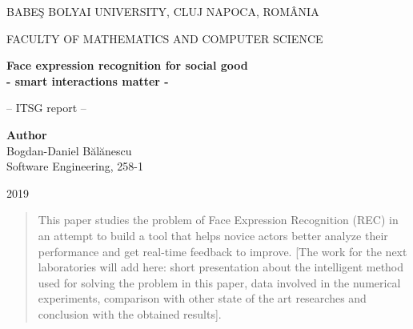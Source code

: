 \documentclass[runningheads,a4paper,11pt]{report}
\begin{document}
\begin{titlepage}
\sloppy
\begin{center}
BABE\c S BOLYAI UNIVERSITY, CLUJ NAPOCA, ROM\^ ANIA

FACULTY OF MATHEMATICS AND COMPUTER SCIENCE

\vspace{5cm}

\Huge \textbf
{
Face expression recognition for social good \\
- smart interactions matter -
}

\vspace{1cm}

\normalsize -- ITSG report --

\end{center}


\vspace{5cm}

\begin{flushright}
\Large{\textbf{Author}}\\
Bogdan-Daniel B\u{a}l\u{a}nescu\\
Software Engineering, 258-1
\end{flushright}

\vspace{4cm}

\begin{center}
2019
\end{center}

\end{titlepage}


\begin{abstract}
	This paper studies the problem of Face Expression Recognition (REC) in an attempt to build a tool that helps novice actors better analyze their performance and get real-time feedback to improve. [The work for the next laboratories will add here: short presentation about the intelligent method used for solving the problem in this paper, data involved in the numerical experiments, comparison with other state of the art researches and conclusion with the obtained results].
\end{abstract}


\tableofcontents

\newpage


\newpage

\end{document}
